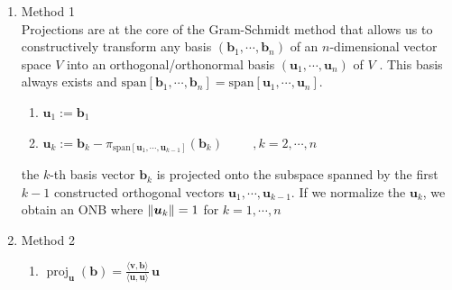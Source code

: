 \begin{enumerate}
    \item Method 1 
    \hfill \cite{mfml/book/mml/Deisenroth-Faisal-Ong}
    \\
    Projections are at the core of the Gram-Schmidt method that allows us to constructively transform any basis $(\bm{b}_1, \cdots , \bm{b}_n)$ of an $n$-dimensional vector space $V$ into an orthogonal/orthonormal basis $(\bm{u}_1, \cdots ,\bm{u}_n)$ of $V$ .
    This basis always exists and $\text{span}[\bm{b}_1, \cdots , \bm{b}_n] = \text{span}[\bm{u}_1, \cdots , \bm{u}_n]$.
    \hfill \cite{mfml/book/mml/Deisenroth-Faisal-Ong}
    \begin{enumerate}
        \item $\bm{u}_1 := \bm{b}_1$
        \hfill \cite{mfml/book/mml/Deisenroth-Faisal-Ong}

        \item $
            \bm{u}_k := \bm{b}_k - \pi_{\text{span}[\bm{u}_1,\cdots,\bm{u}_{k-1}]}(\bm{b}_k)
            \hspace{1cm}
            ,k = 2, \cdots , n
        $
        \hfill \cite{mfml/book/mml/Deisenroth-Faisal-Ong}
    \end{enumerate}
    the $k$-th basis vector $\bm{b}_k$ is projected onto the subspace spanned by the first $k - 1$ constructed orthogonal vectors $\bm{u}_1, \cdots ,\bm{u}_{k-1}$.
    If we normalize the $\bm{u}_k$, we obtain an ONB where $\left\| \bm{u}_k \right\| = 1$ for $k = 1, \cdots , n$
    

    \item Method 2
    \hfill \cite{mfml/wiki/Gram-Schmidt_process}
    \begin{enumerate}
        \item ${
            \displaystyle 
            \operatorname {proj} _{\mathbf {u} }(\mathbf {b} )
            ={\frac {\langle \mathbf {v} ,\mathbf {b} \rangle }{\langle \mathbf {u} ,\mathbf {u} \rangle }}
            \,\mathbf {u} 
        }$
        \hfill \cite{mfml/wiki/Gram-Schmidt_process}


\end{enumerate}
\end{enumerate}
